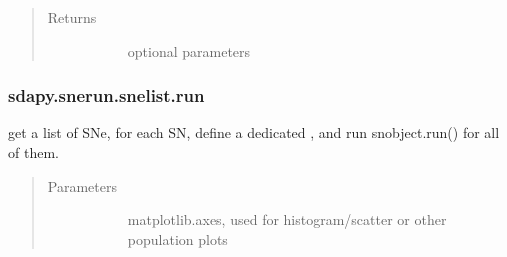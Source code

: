 \documentclass[letterpaper,10pt,english]{sphinxmanual}
\begin{document}
\begin{fulllineitems}
\begin{fulllineitems}
\begin{quote}
\begin{description}
\begin{description}
\end{description}

\item[{Returns}] \leavevmode\begin{description}
\item[{}] \leavevmode{[}\sphinxtitleref{Keyword Arguments}{]}
optional parameters

\end{description}

\end{description}\end{quote}



\begin{description}
\item[{{\hyperref[\detokenize{generated/sdapy.snerun.snelist.__init__:sdapy.snerun.snelist.__init__}]{}}}] \leavevmode
\end{description}



\end{fulllineitems}



\subsubsection{sdapy.snerun.snelist.run}
\label{\detokenize{generated/sdapy.snerun.snelist.run:sdapy-snerun-snelist-run}}\label{\detokenize{generated/sdapy.snerun.snelist.run::doc}}

\begin{fulllineitems}
\label{\detokenize{generated/sdapy.snerun.snelist.run:sdapy.snerun.snelist.run}}
get a list of SNe, for each SN, define a dedicated , and run snobject.run() for
all of them.
\begin{quote}\begin{description}
\item[{Parameters}] \leavevmode\begin{description}
\item[{}] \leavevmode{[}\sphinxtitleref{str}{]}
matplotlib.axes, used for histogram/scatter or other population plots


\end{description}
\end{description}
\end{quote}
\end{fulllineitems}
\end{fulllineitems}
\end{document}

